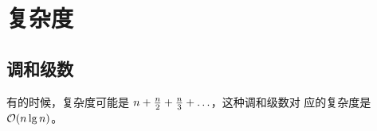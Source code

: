 \section{复杂度}
\label{sec:复杂度}



\subsection{调和级数}
\label{subsec:调和级数复杂度}

有的时候，复杂度可能是 $n + {n \over 2} + {n \over 3} + \ldots$，这种调和级数对
应的复杂度是 $\mathcal{O}(n \lg n)$。


